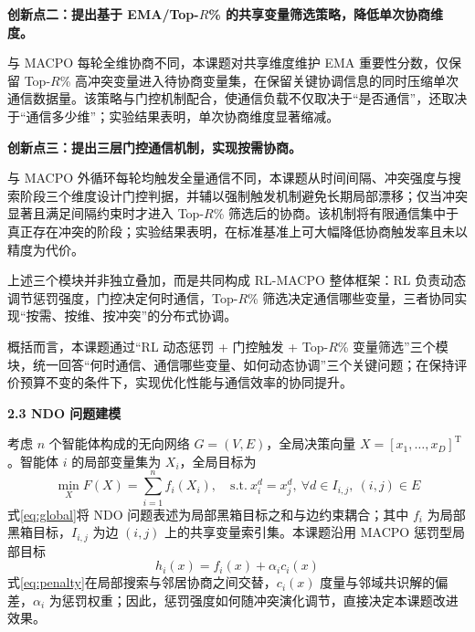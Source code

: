 \par
\indent
\textbf{创新点二：提出基于 EMA/Top-$R$\% 的共享变量筛选策略，降低单次协商维度。}
\par
与 MACPO 每轮全维协商不同，本课题对共享维度维护 EMA 重要性分数，仅保留 Top-$R$\% 高冲突变量进入待协商变量集，在保留关键协调信息的同时压缩单次通信数据量。该策略与门控机制配合，使通信负载不仅取决于“是否通信”，还取决于“通信多少维”；实验结果表明，单次协商维度显著缩减。

\par
\indent
\textbf{创新点三：提出三层门控通信机制，实现按需协商。}
\par
与 MACPO 外循环每轮均触发全量通信不同，本课题从时间间隔、冲突强度与搜索阶段三个维度设计门控判据，并辅以强制触发机制避免长期局部漂移；仅当冲突显著且满足间隔约束时才进入 Top-$R$\% 筛选后的协商。该机制将有限通信集中于真正存在冲突的阶段；实验结果表明，在标准基准上可大幅降低协商触发率且未以精度为代价。

\par
\indent
上述三个模块并非独立叠加，而是共同构成 RL-MACPO 整体框架：RL 负责动态调节惩罚强度，门控决定何时通信，Top-$R$\% 筛选决定通信哪些变量，三者协同实现“按需、按维、按冲突”的分布式协调。

\par
\indent
概括而言，本课题通过“RL 动态惩罚 + 门控触发 + Top-$R$\% 变量筛选”三个模块，统一回答“何时通信、通信哪些变量、如何动态协调”三个关键问题；在保持评价预算不变的条件下，实现优化性能与通信效率的协同提升。

\par
\indent
\textbf{2.3 NDO 问题建模}
\par
考虑 $n$ 个智能体构成的无向网络 $G=(V,E)$，全局决策向量 $X=[x_1,\ldots,x_D]^{\mathrm{T}}$。智能体 $i$ 的局部变量集为 $X_i$，全局目标为
\begin{equation}
\label{eq:global}
\min_{X} F(X)=\sum_{i=1}^{n} f_i(X_i),
\quad \mathrm{s.t.}\ x_i^d=x_j^d,\ \forall d\in I_{i,j},\ (i,j)\in E
\end{equation}
式\eqref{eq:global}将 NDO 问题表述为局部黑箱目标之和与边约束耦合；其中 $f_i$ 为局部黑箱目标，$I_{i,j}$ 为边 $(i,j)$ 上的共享变量索引集。本课题沿用 MACPO 惩罚型局部目标
\begin{equation}
\label{eq:penalty}
h_i(x)=f_i(x)+\alpha_i c_i(x)
\end{equation}
式\eqref{eq:penalty}在局部搜索与邻居协商之间交替，$c_i(x)$ 度量与邻域共识解的偏差，$\alpha_i$ 为惩罚权重\cite{chen2024macpo}；因此，惩罚强度如何随冲突演化调节，直接决定本课题改进效果。

